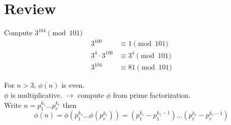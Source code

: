 \newpage
\section{Review}
    \begin{example}
        Compute $3^{104}\pmod{101}$
        \begin{align*}
            3^{100} &\equiv 1\pmod{101} \\
            3^4\cdot 3^{100} &\equiv 3^4\pmod{101} \\
            3^{104} &\equiv 81\pmod{101}
        \end{align*}
    \end{example}

    \begin{example}
        For $n>3$, $\phi(n)$ is even. \\
        $\phi$ is multiplicative. $\rightarrow$ compute $\phi$ from prime factorization. \\
        Write $n=p_1^{k_1}\dots p_r^{k_r}$ then
        \[ \phi(n) = \phi(p_1^{k_1}\dots \phi(p_r^{k_r})) = (p_1^{k_1}-p_1^{k_1-1})\dots (p_r^{k_r} - p_r^{k_r-1}) \]

    \end{example}